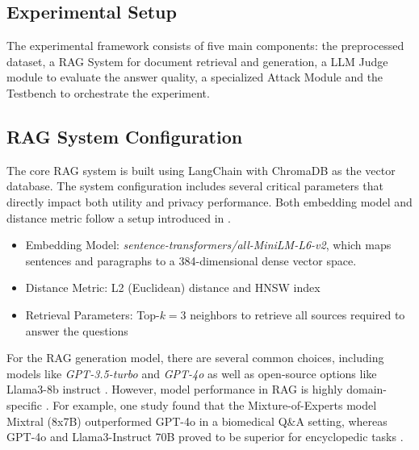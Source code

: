 \subsection{Experimental Setup}
The experimental framework consists of five main components: the preprocessed dataset, a {RAG} System for document retrieval and generation, a LLM Judge module to evaluate the answer quality, a specialized Attack Module and the Testbench to orchestrate the experiment.

\subsection{RAG System Configuration}\label{evaluation-subsec:sys-config}
The core {RAG} system is built using LangChain with ChromaDB as the vector database. The system configuration includes several critical parameters that directly impact both utility and privacy performance. Both embedding model and distance metric follow a setup introduced in \cite{goodAndBad}.
\begin{itemize}
    \item Embedding Model: \textit{sentence-transformers/all-MiniLM-L6-v2}, which maps sentences and paragraphs to a 384-dimensional dense vector space.
    \item Distance Metric: L2 (Euclidean) distance and HNSW index
    \item Retrieval Parameters: Top-$k=3$ neighbors to retrieve all sources required to answer the questions
\end{itemize}


For the RAG generation model, there are several common choices, including models like \textit{GPT-3.5-turbo} and \textit{GPT-4o} \cite{gpt4oModel} as well as open-source options like Llama3-8b instruct \cite{llama3Model}. However, model performance in RAG is highly domain-specific \cite{modelChoiceRAG}. For example, one study found that the Mixture-of-Experts model Mixtral (8x7B) \cite{mixtralModel} outperformed GPT-4o in a biomedical Q\&A setting, whereas GPT-4o and Llama3-Instruct 70B proved to be superior for encyclopedic tasks \cite{modelChoiceRAG}.

